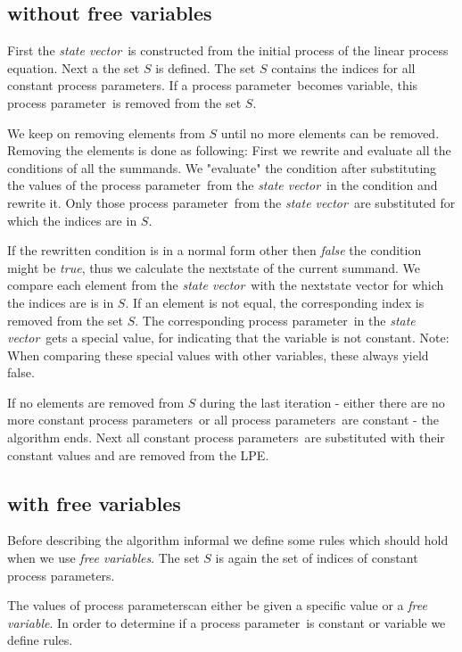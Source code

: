 \index{}\documentclass[a4paper,10pt]{article}
\theoremstyle{plain}
\theoremstyle{definition}
\newcommand{\lpe}{linear process equation}
\newcommand{\pp}{process parameter}
\newcommand{\pps}{process parameters}
\newcommand{\ti}{\textit}
\newcommand{\sv}{\textit{state vector}}
\begin{document}
\subsection{without free variables}

First the \sv\ is constructed from the initial process of the \lpe. Next a the set $S$ is defined. The set $S$ contains the indices for all constant \pps . If a \pp\ becomes variable, this \pp\ is removed from the set $S$.

We keep on removing elements from $S$ until no more elements can be removed. Removing the elements is done as following:
First we rewrite and evaluate all the conditions of all the summands. We "evaluate" the condition after substituting the values of the \pp\ from the \sv\ in the condition and rewrite it. Only those \pp\ from the \sv\ are substituted for which the indices are in $S$. 

If the rewritten condition is in a normal form other then \ti{false} the condition might be \ti{true}, thus we calculate the nextstate of the current summand.  We compare each element from the \sv\ with the nextstate vector for which the indices are is in $S$. If an element is not equal, the corresponding index is removed from the set $S$. The corresponding \pp\ in the \sv\ gets a special value, for indicating that the variable is not constant. Note: When comparing these special values with other variables, these always yield false. 

If no elements are removed from $S$ during the last iteration - either there are no more constant \pps\ or all \pps\ are constant - the algorithm ends. Next all constant \pps\ are substituted with their constant values and are removed from the LPE. 

\subsection{with free variables}
Before describing the algorithm informal we define some rules which should hold when we use \ti{free variables}. The set  $S$ is again the set of indices of constant \pps .

The values of \pps can either be given a specific value or a \ti{free variable}. In order to determine if a \pp\ is constant or variable we define rules.
\end{document}
